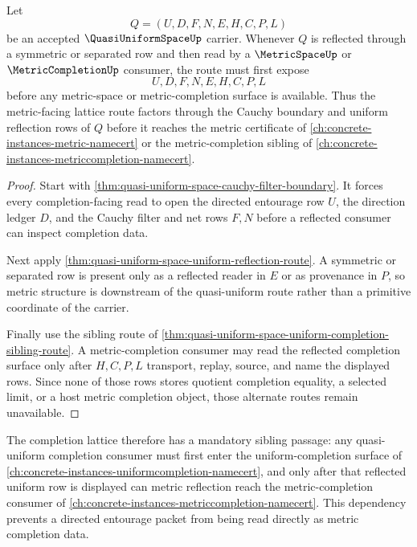 \begin{theorem}
\label{thm:quasi-uniform-space-metric-reflection-lattice-route}
Let
$$
Q=(U,D,F,N,E,H,C,P,L)
$$
be an accepted $\QuasiUniformSpaceUp$ carrier. Whenever $Q$ is reflected through a symmetric or separated row and then read by a $\MetricSpaceUp$ or $\MetricCompletionUp$ consumer, the route must first expose
$$
U,D,F,N,E,H,C,P,L
$$
before any metric-space or metric-completion surface is available. Thus the metric-facing lattice route factors through the Cauchy boundary and uniform reflection rows of $Q$ before it reaches the metric certificate of \autoref{ch:concrete-instances-metric-namecert} or the metric-completion sibling of \autoref{ch:concrete-instances-metriccompletion-namecert}.
\end{theorem}
\begin{proof}
Start with \autoref{thm:quasi-uniform-space-cauchy-filter-boundary}. It forces every completion-facing read to open the directed entourage row $U$, the direction ledger $D$, and the Cauchy filter and net rows $F,N$ before a reflected consumer can inspect completion data.

Next apply \autoref{thm:quasi-uniform-space-uniform-reflection-route}. A symmetric or separated row is present only as a reflected reader in $E$ or as provenance in $P$, so metric structure is downstream of the quasi-uniform route rather than a primitive coordinate of the carrier.

Finally use the sibling route of \autoref{thm:quasi-uniform-space-uniform-completion-sibling-route}. A metric-completion consumer may read the reflected completion surface only after $H,C,P,L$ transport, replay, source, and name the displayed rows. Since none of those rows stores quotient completion equality, a selected limit, or a host metric completion object, those alternate routes remain unavailable.
\end{proof}

The completion lattice therefore has a mandatory sibling passage: any quasi-uniform completion consumer must first enter the uniform-completion surface of \autoref{ch:concrete-instances-uniformcompletion-namecert}, and only after that reflected uniform row is displayed can metric reflection reach the metric-completion consumer of \autoref{ch:concrete-instances-metriccompletion-namecert}. This dependency prevents a directed entourage packet from being read directly as metric completion data.



